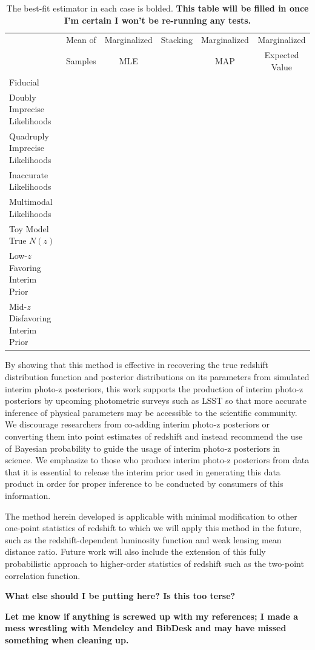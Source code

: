 \documentclass[preprint]{aastex}
\begin{document}
\begin{table}
\begin{tabular}{lccccc}
& Mean of & Marginalized & Stacking & Marginalized & Marginalized\\
& Samples & MLE & & MAP & Expected Value\\
Fiducial &&&&&\\
Doubly Imprecise Likelihoods &&&&&\\
Quadruply Imprecise Likelihoods &&&&&\\
Inaccurate Likelihoods &&&&&\\
Multimodal Likelihoods &&&&&\\
Toy Model True $N(z)$ &&&&&\\
Low-$z$ Favoring Interim Prior &&&&&\\
Mid-$z$ Disfavoring Interim Prior &&&&&
\end{tabular}
\caption{The best-fit estimator in each case is bolded.  \textbf{This table 
will be filled in once I'm certain I won't be re-running any tests.}}
\label{tab:kld}
\end{table}

By showing that this method is effective in recovering the true redshift 
distribution function and posterior distributions on its parameters from 
simulated interim photo-z posteriors, this work supports the production of 
interim photo-z posteriors by upcoming photometric surveys such as LSST so that 
more accurate inference of physical parameters may be accessible to the 
scientific community.  We discourage researchers from co-adding interim photo-z 
posteriors or converting them into point estimates of redshift and instead 
recommend the use of Bayesian probability to guide the usage of interim photo-z 
posteriors in science.  We emphasize to those who produce interim photo-z 
posteriors from data that it is essential to release the interim prior used in 
generating this data product in order for proper inference to be conducted by 
consumers of this information.

The method herein developed is applicable with minimal modification to other 
one-point statistics of redshift to which we will apply this method in the 
future, such as the redshift-dependent luminosity function and weak lensing 
mean distance ratio.  Future work will also include the extension of this fully 
probabilistic approach to higher-order statistics of redshift such as the 
two-point correlation function.

\textbf{What else should I be putting here?  Is this too terse?}

\clearpage
\textbf{Let me know if anything is screwed up with my references; I made a mess 
wrestling with Mendeley and BibDesk and may have missed something when cleaning 
up.}


\end{document}
